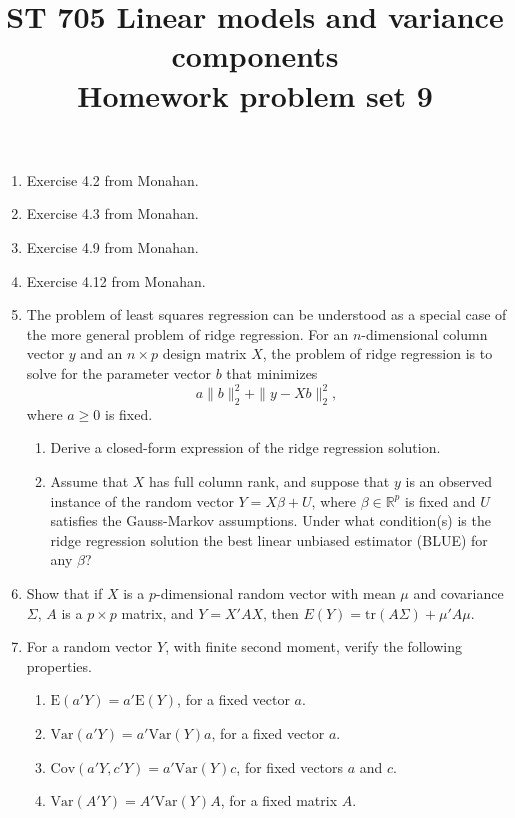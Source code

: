 \documentclass[11pt]{article}
\title{ST 705 Linear models and variance components \\ 
        Homework problem set 9}
\begin{document}
\maketitle

\begin{enumerate}


\item Exercise 4.2 from Monahan.

\item Exercise 4.3 from Monahan.

\item Exercise 4.9 from Monahan.

\item Exercise 4.12 from Monahan.

\item The problem of least squares regression can be understood as a special case of the more general problem of ridge regression.  For an $n$-dimensional column vector $y$ and an $n\times p$ design matrix $X$, the problem of ridge regression is to solve for the parameter vector $b$ that minimizes
\[
a\|b\|_{2}^{2} + \|y - Xb\|_{2}^{2},
\]
where $a \ge 0$ is fixed.
\begin{enumerate}
\item Derive a closed-form expression of the ridge regression solution.
\item Assume that $X$ has full column rank, and suppose that $y$ is an observed instance of the random vector $Y = X\beta + U$, where $\beta \in \mathbb{R}^{p}$ is fixed and $U$ satisfies the Gauss-Markov assumptions.  Under what condition(s) is the ridge regression solution the best linear unbiased estimator (BLUE) for any $\beta$?
\end{enumerate}


\item Show that if $X$ is a $p$-dimensional random vector with mean $\mu$ and covariance $\Sigma$, $A$ is a $p\times p$ matrix, and $Y = X'AX$, then $E(Y) = \text{tr}(A\Sigma) + \mu'A\mu$.

\item For a random vector $Y$, with finite second moment, verify the following properties.
\begin{enumerate}
\item $\text{E}(a'Y) = a'\text{E}(Y)$, for a fixed vector $a$.
\item $\text{Var}(a'Y) = a'\text{Var}(Y)a$, for a fixed vector $a$.
\item $\text{Cov}(a'Y,c'Y) = a'\text{Var}(Y)c$, for fixed vectors $a$ and $c$.
\item $\text{Var}(A'Y) = A'\text{Var}(Y)A$, for a fixed matrix $A$.
\end{enumerate}


\end{enumerate}
\end{document}
